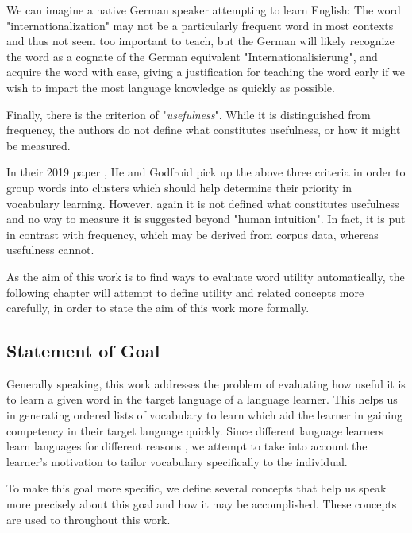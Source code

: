 We can imagine a native German speaker attempting to learn English:
The word "internationalization" may not be a particularly frequent word in most contexts and thus not seem too important to teach, but the German will likely recognize the word as a cognate of the German equivalent "Internationalisierung", and acquire the word with ease, giving a justification for teaching the word early if we wish to impart the most language knowledge as quickly as possible.

Finally, there is the criterion of "\textit{usefulness}".
While it is distinguished from frequency, the authors do not define what constitutes usefulness, or how it might be measured.

In their 2019 paper \cite{heChoosingWordsTeach2019}, He and Godfroid pick up the above three criteria in order to group words into clusters which should help determine their priority in vocabulary learning.
However, again it is not defined what constitutes usefulness and no way to measure it is suggested beyond "human intuition".
In fact, it is put in contrast with frequency, which may be derived from corpus data, whereas usefulness cannot.

As the aim of this work is to find ways to evaluate word utility automatically, the following chapter will attempt to define utility and related concepts more carefully, in order to state the aim of this work more formally.

\subsection{Statement of Goal} \label{sec:statement-of-goal}

Generally speaking, this work addresses the problem of evaluating how useful it is to learn a given word in the target language of a language learner.
This helps us in generating ordered lists of vocabulary to learn which aid the learner in gaining competency in their target language quickly.
Since different language learners learn languages for different reasons , we attempt to take into account the learner's motivation to tailor vocabulary specifically to the individual.

To make this goal more specific, we define several concepts that help us speak more precisely about this goal and how it may be accomplished.
These concepts are used to throughout this work.

